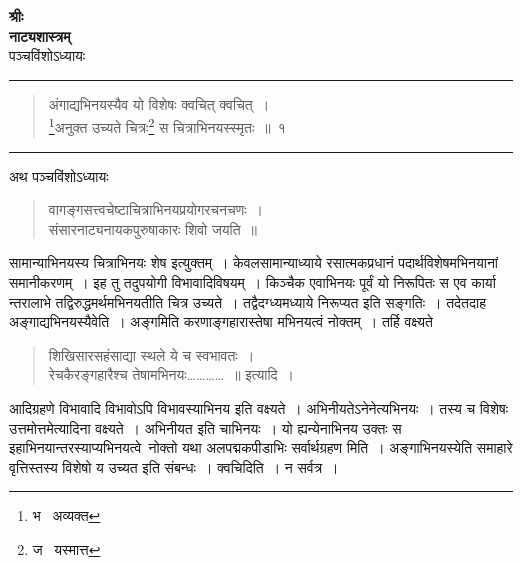 \documentclass[11pt, openany]{book}
\begin{document}
\newpage
\thispagestyle{empty}
\begin{center}
\textbf{\large श्रीः}\\

\vspace{2mm}
\textbf{\huge नाट्यशास्त्रम्}\\

\vspace{2mm}
पञ्चविंशोऽध्यायः\\

\vspace{2mm}
\rule{0.2\linewidth}{0.5pt}
\end{center}

\begin{quote}
{\na अंगाद्यभिनयस्यैव यो विशेषः क्वचित् क्वचित्~।\\
\renewcommand{\thefootnote}{1}\footnote{भ \textendash\  अव्यक्त}अनुक्त उच्यते चित्रः\renewcommand{\thefootnote}{2}\footnote{ज \textendash\  यस्मात्त} स चित्राभिनयस्स्मृतः~॥~१}
\end{quote}

\hrule

\begin{center}
अथ पञ्चविंशोऽध्यायः
\end{center}

\begin{quote}
{\qt वागङ्गसत्त्वचेष्टाचित्राभिनयप्रयोगरचनचणः~।\\
संसारनाट्यनायकपुरुषाकारः शिवो जयति~॥}
\end{quote}

सामान्याभिनयस्य चित्राभिनयः शेष इत्युक्तम्~। केवलसामान्याध्याये रसात्मकप्रधानं पदार्थविशेषमभिनयानां समानीकरणम्~। इह तु तदुपयोगी विभावादिविषयम्~। किञ्चैक एवाभिनयः पूर्वं यो निरूपितः स एव कार्या न्तरालाभे तद्विरुद्धमर्थमभिनयतीति चित्र उच्यते~। तद्वैदग्ध्यमध्याये निरूप्यत इति सङ्गतिः~। तदेतदाह अङ्गाद्यभिनयस्यैवेति~। अङ्गमिति करणाङ्गहारास्तेषा मभिनयत्वं नोक्तम्~। तर्हि वक्ष्यते\textendash

\begin{quote}
{\qt शिखिसारसहंसाद्या स्थले ये च स्वभावतः~।\\
रेचकैरङ्गहारैश्च तेषामभिनयः\ldots \ldots \ldots \ldots ~॥} इत्यादि~।
\end{quote}

\noindent
आदिग्रहणे विभावादि विभावोऽपि विभावस्याभिनय इति वक्ष्यते~। अभिनीयतेऽनेनेत्यभिनयः~। तस्य च विशेषः उत्तमोत्तमेत्यादिना वक्ष्यते~। अभिनीयत इति चाभिनयः~। यो ह्यन्येनाभिनय उक्तः स इहाभिनयान्तरस्याप्यभिनयत्वे\textendash\ नोक्तो यथा {\qt अलपद्मकपीडाभिः सर्वार्थग्रहण} मिति~। अङ्गाभिनयस्येति समाहारे वृत्तिस्तस्य विशेषो य उच्यत इति संबन्धः~। क्वचिदिति~। न सर्वत्र~। 
\end{document}
